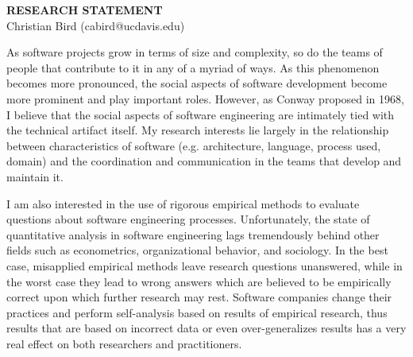 \documentclass[10pt]{article}
\begin{document}
\thispagestyle{fancy}
\lhead{}
\rhead{}
\renewcommand{\headrulewidth}{0pt} 
\renewcommand{\footrulewidth}{0pt} 
\fancyfoot[C]{\footnotesize \textcolor{gray}{http://wwwcsif.ucdavis.edu/$\sim$bird/index.html}}


\pagestyle{fancy}
\lhead{\textcolor{gray}{\it Christian Bird, Research Statement}}
\rhead{\textcolor{gray}{\thepage/\totalpages{}}}

\begin{small}

\begin{center}
{\LARGE \bf RESEARCH STATEMENT}\\
\vspace*{0.1cm}
{\normalsize Christian Bird (cabird@ucdavis.edu)}
\end{center}



As software projects grow in terms of size and complexity, so do the teams of
people that contribute to it in any of a myriad of ways.  As this phenomenon
becomes more pronounced, the social aspects of software development become more
prominent and play important roles.  However, as Conway proposed in 1968, I
believe that the social aspects of software engineering are intimately tied
with the technical artifact itself.  My research interests lie largely in the
relationship between characteristics of software (e.g. architecture, language,
process used, domain) and the coordination and communication in the
teams that develop and maintain it.

I am also interested in the use of rigorous empirical methods to evaluate
questions about software engineering processes.  Unfortunately, the state
of quantitative analysis in software engineering lags tremendously behind
other fields such as econometrics, organizational behavior, and sociology.
In the best case, misapplied empirical methods leave research questions
unanswered, while in the worst case they lead to wrong answers which are believed
to be empirically correct upon which further research may rest.  Software
companies change their practices and perform self-analysis based on results
of empirical research, thus results that are based on incorrect data or even
over-generalizes results has a very real effect on both researchers and 
practitioners.


\end{small}
\end{document}
